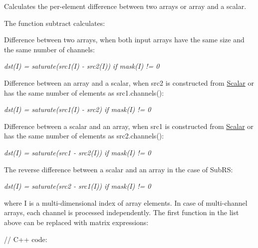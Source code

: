 Calculates the per-\/element difference between two arrays or array and a scalar.

The function {\ttfamily subtract} calculates\+:


\begin{DoxyItemize}
\item Difference between two arrays, when both input arrays have the same size and the same number of channels\+: 
\end{DoxyItemize}

{\itshape dst(\+I) = saturate(src1(\+I) -\/ src2(\+I)) if mask(\+I) != 0}


\begin{DoxyItemize}
\item Difference between an array and a scalar, when {\ttfamily src2} is constructed from {\ttfamily \mbox{\hyperlink{classorg_1_1opencv_1_1core_1_1_scalar}{Scalar}}} or has the same number of elements as {\ttfamily src1.\+channels()}\+: 
\end{DoxyItemize}

{\itshape dst(\+I) = saturate(src1(\+I) -\/ src2) if mask(\+I) != 0}


\begin{DoxyItemize}
\item Difference between a scalar and an array, when {\ttfamily src1} is constructed from {\ttfamily \mbox{\hyperlink{classorg_1_1opencv_1_1core_1_1_scalar}{Scalar}}} or has the same number of elements as {\ttfamily src2.\+channels()}\+: 
\end{DoxyItemize}

{\itshape dst(\+I) = saturate(src1 -\/ src2(\+I)) if mask(\+I) != 0}


\begin{DoxyItemize}
\item The reverse difference between a scalar and an array in the case of {\ttfamily Sub\+RS}\+: 
\end{DoxyItemize}

{\itshape dst(\+I) = saturate(src2 -\/ src1(\+I)) if mask(\+I) != 0}

where {\ttfamily I} is a multi-\/dimensional index of array elements. In case of multi-\/channel arrays, each channel is processed independently. The first function in the list above can be replaced with matrix expressions\+: {\ttfamily }

{\ttfamily }

{\ttfamily }

{\ttfamily // C++ code\+:}

